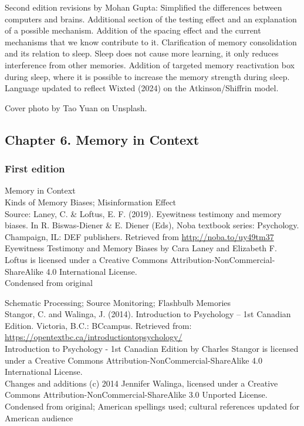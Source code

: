 \documentclass[
]{krantz}
\begin{document}
Second edition revisions by Mohan Gupta: Simplified the differences between computers and brains. Additional section of the testing effect and an explanation of a possible mechanism. Addition of the spacing effect and the current mechanisms that we know contribute to it. Clarification of memory consolidation and its relation to sleep. Sleep does not cause more learning, it only reduces interference from other memories. Addition of targeted memory reactivation box during sleep, where it is possible to increase the memory strength during sleep. Language updated to reflect Wixted (2024) on the Atkinson/Shiffrin model.

Cover photo by Tao Yuan on Unsplash.

\subsection*{Chapter 6. Memory in Context}\label{chapter-6.-memory-in-context}


\subsubsection*{First edition}\label{first-edition-6}


Memory in Context\\
Kinds of Memory Biases; Misinformation Effect\\
Source: Laney, C. \& Loftus, E. F. (2019). Eyewitness testimony and memory biases. In R. Biswas-Diener \& E. Diener (Eds), Noba textbook series: Psychology. Champaign, IL: DEF publishers. Retrieved from \url{http://noba.to/uy49tm37}\\
Eyewitness Testimony and Memory Biases by Cara Laney and Elizabeth F. Loftus is licensed under a Creative Commons Attribution-NonCommercial-ShareAlike 4.0 International License.\\
Condensed from original

Schematic Processing; Source Monitoring; Flashbulb Memories\\
Stangor, C. and Walinga, J. (2014). Introduction to Psychology -- 1st Canadian Edition. Victoria, B.C.: BCcampus. Retrieved from: \url{https://opentextbc.ca/introductiontopsychology/}\\
Introduction to Psychology - 1st Canadian Edition by Charles Stangor is licensed under a Creative Commons Attribution-NonCommercial-ShareAlike 4.0 International License.\\
Changes and additions (c) 2014 Jennifer Walinga, licensed under a Creative Commons Attribution-NonCommercial-ShareAlike 3.0 Unported License.\\
Condensed from original; American spellings used; cultural references updated for American audience
\end{document}

